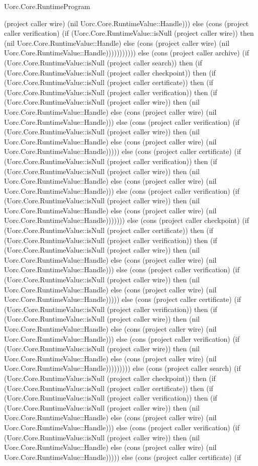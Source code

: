 \begin{lexlean}{Uorc.Core.RuntimeProgram}
\begin{semanticmodule}
{(project caller wire) (nil Uorc.Core.RuntimeValue::Handle))) else (cons (project caller verification) (if (Uorc.Core.RuntimeValue::isNull (project caller wire)) then (nil Uorc.Core.RuntimeValue::Handle) else (cons (project caller wire) (nil Uorc.Core.RuntimeValue::Handle))))))))))) else (cons (project caller archive) (if (Uorc.Core.RuntimeValue::isNull (project caller search)) then (if (Uorc.Core.RuntimeValue::isNull (project caller checkpoint)) then (if (Uorc.Core.RuntimeValue::isNull (project caller certificate)) then (if (Uorc.Core.RuntimeValue::isNull (project caller verification)) then (if (Uorc.Core.RuntimeValue::isNull (project caller wire)) then (nil Uorc.Core.RuntimeValue::Handle) else (cons (project caller wire) (nil Uorc.Core.RuntimeValue::Handle))) else (cons (project caller verification) (if (Uorc.Core.RuntimeValue::isNull (project caller wire)) then (nil Uorc.Core.RuntimeValue::Handle) else (cons (project caller wire) (nil Uorc.Core.RuntimeValue::Handle))))) else (cons (project caller certificate) (if (Uorc.Core.RuntimeValue::isNull (project caller verification)) then (if (Uorc.Core.RuntimeValue::isNull (project caller wire)) then (nil Uorc.Core.RuntimeValue::Handle) else (cons (project caller wire) (nil Uorc.Core.RuntimeValue::Handle))) else (cons (project caller verification) (if (Uorc.Core.RuntimeValue::isNull (project caller wire)) then (nil Uorc.Core.RuntimeValue::Handle) else (cons (project caller wire) (nil Uorc.Core.RuntimeValue::Handle))))))) else (cons (project caller checkpoint) (if (Uorc.Core.RuntimeValue::isNull (project caller certificate)) then (if (Uorc.Core.RuntimeValue::isNull (project caller verification)) then (if (Uorc.Core.RuntimeValue::isNull (project caller wire)) then (nil Uorc.Core.RuntimeValue::Handle) else (cons (project caller wire) (nil Uorc.Core.RuntimeValue::Handle))) else (cons (project caller verification) (if (Uorc.Core.RuntimeValue::isNull (project caller wire)) then (nil Uorc.Core.RuntimeValue::Handle) else (cons (project caller wire) (nil Uorc.Core.RuntimeValue::Handle))))) else (cons (project caller certificate) (if (Uorc.Core.RuntimeValue::isNull (project caller verification)) then (if (Uorc.Core.RuntimeValue::isNull (project caller wire)) then (nil Uorc.Core.RuntimeValue::Handle) else (cons (project caller wire) (nil Uorc.Core.RuntimeValue::Handle))) else (cons (project caller verification) (if (Uorc.Core.RuntimeValue::isNull (project caller wire)) then (nil Uorc.Core.RuntimeValue::Handle) else (cons (project caller wire) (nil Uorc.Core.RuntimeValue::Handle))))))))) else (cons (project caller search) (if (Uorc.Core.RuntimeValue::isNull (project caller checkpoint)) then (if (Uorc.Core.RuntimeValue::isNull (project caller certificate)) then (if (Uorc.Core.RuntimeValue::isNull (project caller verification)) then (if (Uorc.Core.RuntimeValue::isNull (project caller wire)) then (nil Uorc.Core.RuntimeValue::Handle) else (cons (project caller wire) (nil Uorc.Core.RuntimeValue::Handle))) else (cons (project caller verification) (if (Uorc.Core.RuntimeValue::isNull (project caller wire)) then (nil Uorc.Core.RuntimeValue::Handle) else (cons (project caller wire) (nil Uorc.Core.RuntimeValue::Handle))))) else (cons (project caller certificate) (if }
\end{semanticmodule}
\end{lexlean}
